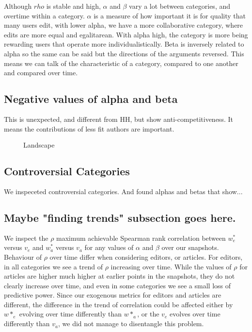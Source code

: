 \documentclass{acm_proc_article-sp}
\begin{document}
Although $rho$ is stable and high, $\alpha$ and $\beta$ vary a lot between categories, and overtime within a category. $\alpha$ is a measure of how important it is for quality that many users edit, with lower alpha, we have a more collaborative category, where edits are more equal and egalitarean. With alpha high, the category is more being rewarding users that operate more individualistically. Beta is inversely related to alpha so the same can be said but the directions of the arguments reversed. This means we can talk of the characteristic of a category, compared to one another and compared over time. 

\subsection{Negative values of alpha and beta}
This is unexpected, and different from HH, but show anti-competitiveness. It means the contributions of less fit authors are important.

\begin{figure}[!t]
\centering
\caption{Landscape}
\label{fig:landscape}
\end{figure}

\subsection{Controversial Categories}
We inspeceted controversial categories. And found alphas and betas that show...

\subsection{Maybe "finding trends" subsection goes here.}
We inspect the $\rho$ maximum achievable  Spearman rank correlation between $w^*_e$ versus $v_e$ and $w^*_a$ versus $v_a$ for any values of $\alpha$ and $\beta$ over our snapshots. Behaviour of $\rho$ over time differ when considering editors, or articles. For editors, in all categories we see a trend of $\rho$ increasing over time. While the values of $\rho$ for articles are higher much higher at earlier points in the snapshots, they do not clearly increase over time, and even in some categories we see a small loss of predictive power. Since our exogenous metrics for editors and articles are different, the difference in the trend of correlation could be affected either by $w*_e$ evolving over time differently than $w*_a$, or the $v_e$ evolves over time differently than $v_a$, we did not manage to disentangle this problem.
\end{document}
